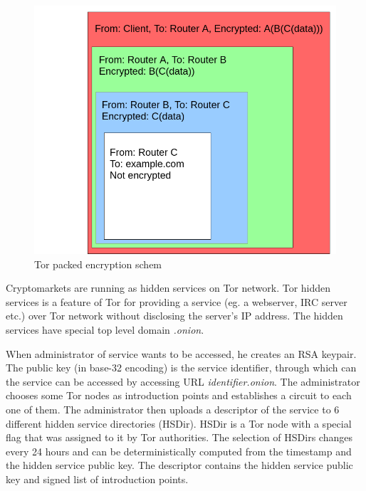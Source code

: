 \documentclass[
  digital, %
  table,   %
  lof,     %
  lot,     %
  oneside
]{fithesis3}
\begin{document}
\begin{figure}[!htb]
    \centering
    \includegraphics[width=1\textwidth]{tor-packet}
    \caption{Tor packed encryption schem}
    \label{tor-packet}
\end{figure}
 
Cryptomarkets are running as hidden services on Tor network.
Tor hidden services is a feature of Tor for providing a service (eg. a webserver, IRC server etc.) over Tor network
without disclosing the server's IP address. The hidden services have special top level domain \emph{.onion}.

When administrator of service wants to be accessed, he creates an RSA keypair.
The public key (in base-32 encoding) is the service identifier,
through which can the service can be accessed by accessing URL \emph{identifier.onion}.
The administrator chooses some Tor nodes as introduction points and establishes a circuit to each one of them.
The administrator then uploads a descriptor of the service to 6 different hidden service directories (HSDir).
HSDir is a Tor node with a special flag that was assigned to it by Tor authorities.
The selection of HSDirs changes every 24 hours and can be deterministically computed from the timestamp and the hidden service public key.
The descriptor contains the hidden service public key and signed list of introduction points.
\end{document}
